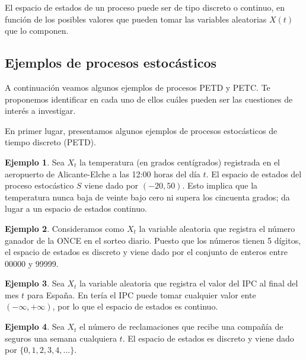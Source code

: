 \documentclass[
]{book}
\theoremstyle{definition}
\theoremstyle{definition}
\newtheorem{example}{Ejemplo}[chapter]
\theoremstyle{definition}
\theoremstyle{definition}
\theoremstyle{remark}
\begin{document}
El espacio de estados de un proceso puede ser de tipo discreto o continuo, en función de los posibles valores que pueden tomar las variables aleatorias \(X(t)\) que lo componen.

\hypertarget{ejemplos-de-procesos-estocuxe1sticos}{%
\subsection{Ejemplos de procesos estocásticos}\label{ejemplos-de-procesos-estocuxe1sticos}}

A continuación veamos algunos ejemplos de procesos PETD y PETC. Te proponemos identificar en cada uno de ellos cuáles pueden ser las cuestiones de interés a investigar.

En primer lugar, presentamos algunos ejemplos de procesos estocásticos de tiempo discreto (PETD).

\begin{example}
\protect\hypertarget{exm:petd1}{}\label{exm:petd1}Sea \(X_t\) la temperatura (en grados centígrados) registrada en el aeropuerto de Alicante-Elche a las 12:00 horas del día \(t\). El espacio de estados del proceso estocástico \(S\) viene dado por \((-20, 50).\) Esto implica que la temperatura nunca baja de veinte bajo cero ni supera los cincuenta grados; da lugar a un espacio de estados continuo.
\end{example}

\begin{example}
\protect\hypertarget{exm:petd2}{}\label{exm:petd2}Consideramos como \(X_t\) la variable aleatoria que registra el número ganador de la ONCE en el sorteo diario. Puesto que los números tienen 5 dígitos, el espacio de estados es discreto y viene dado por el conjunto de enteros entre 00000 y 99999.
\end{example}

\begin{example}
\protect\hypertarget{exm:petd3}{}\label{exm:petd3}Sea \(X_t\) la variable aleatoria que registra el valor del IPC al final del mes \(t\) para España. En tería el IPC puede tomar cualquier valor ente \((-\infty, +\infty)\), por lo que el espacio de estados es continuo.
\end{example}

\begin{example}
\protect\hypertarget{exm:petd4}{}\label{exm:petd4}Sea \(X_t\) el número de reclamaciones que recibe una compañía de seguros una semana cualquiera \(t\). El espacio de estados es discreto y viene dado por \(\{0, 1, 2, 3, 4,...\}\).
\end{example}
\end{document}
